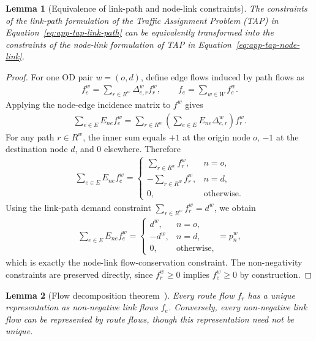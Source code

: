 \documentclass[twocolumn,english,groupedaddress, superscriptaddress,aps,pre,10pt,floatfix]{revtex4-2}
\newtheorem{lemma}{Lemma}
\begin{document}
\begin{lemma}[Equivalence of link-path and node-link constraints]
The constraints of the link-path formulation of the Traffic Assignment Problem (TAP) in Equation~\ref{eq:app-tap-link-path} can be equivalently transformed into the constraints of the node-link formulation of TAP in Equation~\ref{eq:app-tap-node-link}.
\end{lemma}
\begin{proof}
For one OD pair $w=(o,d)$, define edge flows induced by path flows as
\begin{align}
f_e^w=\sum_{r\in R^w}\Delta_{e,r}^w f_r^w,
\qquad
f_e=\sum_{w\in W}f_e^w.
\end{align}
Applying the node-edge incidence matrix to $f^w$ gives
\begin{align}
\sum_{e\in E}E_{ne}f_e^w
=\sum_{r\in R^w}\left(\sum_{e\in E}E_{ne}\Delta_{e,r}^w\right)f_r^w.
\end{align}
For any path $r\in R^w$, the inner sum equals $+1$ at the origin node $o$, $-1$ at the destination node $d$, and $0$ elsewhere. Therefore
\begin{align}
\sum_{e\in E}E_{ne}f_e^w
=
\begin{cases}
\sum_{r\in R^w}f_r^w, & n=o,\\
-\sum_{r\in R^w}f_r^w, & n=d,\\
0, & \text{otherwise}.
\end{cases}
\end{align}
Using the link-path demand constraint $\sum_{r\in R^w}f_r^w=d^w$, we obtain
\begin{align}
\sum_{e\in E}E_{ne}f_e^w
=
\begin{cases}
d^w, & n=o,\\
-d^w, & n=d,\\
0, & \text{otherwise},
\end{cases}
=p_n^w,
\end{align}
which is exactly the node-link flow-conservation constraint.
The non-negativity constraints are preserved directly, since $f_r^w\ge 0$ implies $f_e^w\ge 0$ by construction.
\end{proof}
\begin{lemma}[Flow decomposition theorem~\citep{ahuja1995network, krylatov2020optimization}]
    Every route flow $f_r$ has a unique representation as non-negative link flows $f_e$. Conversely, every non-negative link flow can be represented by route flows, though this representation need not be unique.
\end{lemma}
\end{document}
